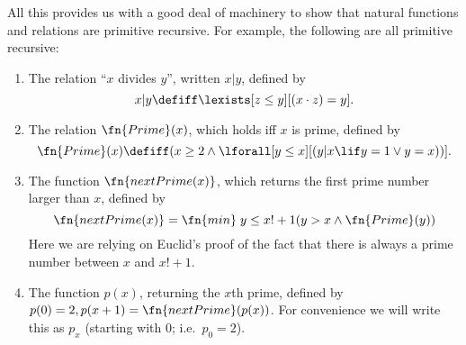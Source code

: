 \documentclass[../../include/open-logic-section]{subfiles}
\begin{document}
All this provides us with a good deal of machinery to show that
natural functions and relations are primitive recursive. For example,
the following are all primitive recursive:
\begin{enumerate}
\item The relation ``$x$ divides $y$'', written $x | y$, defined by
\[
x | y \defiff \lexists[z \leq y][(x \cdot z) = y].
\]

\item The relation $\fn{Prime}(x)$, which holds iff $x$ is prime,
  defined by
\[
\fn{Prime}(x) \defiff (x \geq 2 \land \lforall[y \leq x][(y | x \lif y
  = 1 \lor y = x))].
\]
\item The function $\fn{nextPrime(x)}$, which returns the first prime
  number larger than $x$, defined by
\[
  \fn{nextPrime(x)} = \fn{min} \; {y \leq x!+1} \\ (y > x \land \fn{Prime}(y))
\]
Here we are relying on Euclid's proof of the fact that there is always
a prime number between $x$ and $x!+1$.

\item The function $p(x)$, returning the $x$th prime, defined by $p(0)
  = 2, p(x+1) = \fn{nextPrime}(p(x))$. For convenience we will write
  this as $p_x$ (starting with 0; i.e.\ $p_0=2$).
\end{enumerate}
\end{document}
